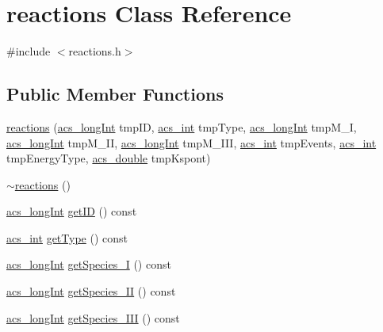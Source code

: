 \hypertarget{a00020}{\section{reactions Class Reference}
\label{a00020}
}


{\ttfamily \#include $<$reactions.\+h$>$}

\subsection*{Public Member Functions}
\begin{DoxyCompactItemize}
\item 
\hyperlink{a00020_a0b6ca1c86d79bb511f116d86714f74a6}{reactions} (\hyperlink{a00050_a19319d75f02db4308bc5c0026d98cd85}{acs\+\_\+long\+Int} tmp\+I\+D, \hyperlink{a00050_a8d277355641a098190360234e2ebde35}{acs\+\_\+int} tmp\+Type, \hyperlink{a00050_a19319d75f02db4308bc5c0026d98cd85}{acs\+\_\+long\+Int} tmp\+M\+\_\+\+I, \hyperlink{a00050_a19319d75f02db4308bc5c0026d98cd85}{acs\+\_\+long\+Int} tmp\+M\+\_\+\+I\+I, \hyperlink{a00050_a19319d75f02db4308bc5c0026d98cd85}{acs\+\_\+long\+Int} tmp\+M\+\_\+\+I\+I\+I, \hyperlink{a00050_a8d277355641a098190360234e2ebde35}{acs\+\_\+int} tmp\+Events, \hyperlink{a00050_a8d277355641a098190360234e2ebde35}{acs\+\_\+int} tmp\+Energy\+Type, \hyperlink{a00050_ab776853a005fcbf56af0424a2a4dd607}{acs\+\_\+double} tmp\+Kspont)
\item 
\hyperlink{a00020_ad0c79e56e87891c502d8fcd6c4005987}{$\sim$reactions} ()
\item 
\hyperlink{a00050_a19319d75f02db4308bc5c0026d98cd85}{acs\+\_\+long\+Int} \hyperlink{a00020_a5c30ce559254e67f7d4e219a8fe26fcc}{get\+I\+D} () const 
\item 
\hyperlink{a00050_a8d277355641a098190360234e2ebde35}{acs\+\_\+int} \hyperlink{a00020_ad928f8c901ad8e318e201cedcf1209ba}{get\+Type} () const 
\item 
\hyperlink{a00050_a19319d75f02db4308bc5c0026d98cd85}{acs\+\_\+long\+Int} \hyperlink{a00020_a90adbdb8288b8c67c7715949848583ab}{get\+Species\+\_\+\+I} () const 
\item 
\hyperlink{a00050_a19319d75f02db4308bc5c0026d98cd85}{acs\+\_\+long\+Int} \hyperlink{a00020_ac0bdd6d9081645bf3a2c5531a71cbe40}{get\+Species\+\_\+\+I\+I} () const 
\item 
\hyperlink{a00050_a19319d75f02db4308bc5c0026d98cd85}{acs\+\_\+long\+Int} \hyperlink{a00020_aaf426633019113ac4ae54cd5597920be}{get\+Species\+\_\+\+I\+I\+I} () const 
\item 

\end{DoxyCompactItemize}
